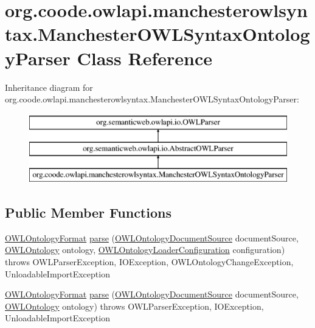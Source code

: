 \hypertarget{classorg_1_1coode_1_1owlapi_1_1manchesterowlsyntax_1_1_manchester_o_w_l_syntax_ontology_parser}{\section{org.\-coode.\-owlapi.\-manchesterowlsyntax.\-Manchester\-O\-W\-L\-Syntax\-Ontology\-Parser Class Reference}
\label{classorg_1_1coode_1_1owlapi_1_1manchesterowlsyntax_1_1_manchester_o_w_l_syntax_ontology_parser}
}
Inheritance diagram for org.\-coode.\-owlapi.\-manchesterowlsyntax.\-Manchester\-O\-W\-L\-Syntax\-Ontology\-Parser\-:\begin{figure}[H]
\begin{center}
\leavevmode
\includegraphics[height=3.000000cm]{classorg_1_1coode_1_1owlapi_1_1manchesterowlsyntax_1_1_manchester_o_w_l_syntax_ontology_parser}
\end{center}
\end{figure}
\subsection*{Public Member Functions}
\begin{DoxyCompactItemize}
\item 
\hyperlink{classorg_1_1semanticweb_1_1owlapi_1_1model_1_1_o_w_l_ontology_format}{O\-W\-L\-Ontology\-Format} \hyperlink{classorg_1_1coode_1_1owlapi_1_1manchesterowlsyntax_1_1_manchester_o_w_l_syntax_ontology_parser_acb907df8a62c334cdb0951c015a94b7e}{parse} (\hyperlink{interfaceorg_1_1semanticweb_1_1owlapi_1_1io_1_1_o_w_l_ontology_document_source}{O\-W\-L\-Ontology\-Document\-Source} document\-Source, \hyperlink{interfaceorg_1_1semanticweb_1_1owlapi_1_1model_1_1_o_w_l_ontology}{O\-W\-L\-Ontology} ontology, \hyperlink{classorg_1_1semanticweb_1_1owlapi_1_1model_1_1_o_w_l_ontology_loader_configuration}{O\-W\-L\-Ontology\-Loader\-Configuration} configuration)  throws O\-W\-L\-Parser\-Exception, I\-O\-Exception, O\-W\-L\-Ontology\-Change\-Exception, Unloadable\-Import\-Exception 
\item 
\hyperlink{classorg_1_1semanticweb_1_1owlapi_1_1model_1_1_o_w_l_ontology_format}{O\-W\-L\-Ontology\-Format} \hyperlink{classorg_1_1coode_1_1owlapi_1_1manchesterowlsyntax_1_1_manchester_o_w_l_syntax_ontology_parser_ab5a6096e212c056cae3da829bb78554c}{parse} (\hyperlink{interfaceorg_1_1semanticweb_1_1owlapi_1_1io_1_1_o_w_l_ontology_document_source}{O\-W\-L\-Ontology\-Document\-Source} document\-Source, \hyperlink{interfaceorg_1_1semanticweb_1_1owlapi_1_1model_1_1_o_w_l_ontology}{O\-W\-L\-Ontology} ontology)  throws O\-W\-L\-Parser\-Exception, I\-O\-Exception, Unloadable\-Import\-Exception 
\end{DoxyCompactItemize}
